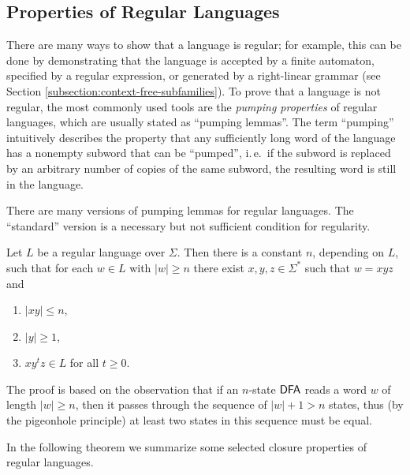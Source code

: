 \subsection{Properties of Regular Languages}
\label{subsection:properties-of-regular-languages}

There are many ways to show that a language is regular; for example, this can be done by demonstrating that the language is accepted by a finite automaton, specified by a regular expression, or generated by a right-linear grammar (see Section \ref{subsection:context-free-subfamilies}). To prove that a language is not regular, the most commonly used tools are the \emph{pumping properties} of regular languages, which are usually stated as ``pumping lemmas''. The term ``pumping'' intuitively describes the property that any sufficiently long word of the language has a nonempty subword that can be ``pumped'', i.\,e.\ if the subword is replaced by an arbitrary number of copies of the same subword, the resulting word is still in the language.

There are many versions of pumping lemmas for regular languages. The ``standard'' version is a necessary but not sufficient condition for regularity.

\begin{lemma}
Let $L$ be a regular language over $\Sigma$. Then there is a constant $n$, depending on $L$, such that for each $w \in L$ with $|w| \ge n$ there exist $x, y, z \in \Sigma^*$ such that $w = xyz$ and
\begin{enumerate}
\item $|xy| \le n$,
\item $|y| \ge 1$,
\item $x y^t z \in L$ for all $t \ge 0$.
\end{enumerate}
\end{lemma}

The proof is based on the observation that if an $n$-state $\textup{\sf DFA}$ reads a word $w$ of length $|w| \ge n$, then it passes through the sequence of $|w| + 1 > n$ states, thus (by the pigeonhole principle) at least two states in this sequence must be equal.

In the following theorem we summarize some selected closure properties of regular languages.


